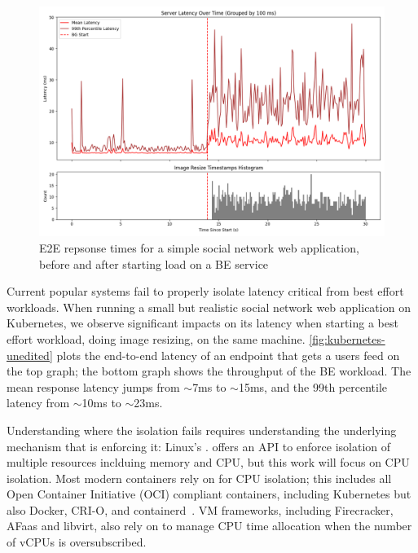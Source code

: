\begin{figure}[t]
    \centering
    \includegraphics[width=\columnwidth]{graphs/kubernetes-unedited.png}
    \caption{E2E repsonse times for a simple social network web application,
    before and after starting load on a BE
    service}\label{fig:kubernetes-unedited}
\end{figure}

Current popular systems fail to properly isolate latency critical from best
effort workloads. When running a small but realistic social network web
application on Kubernetes, we observe significant impacts on its latency when
starting a best effort workload, doing image resizing, on the same machine.
\autoref{fig:kubernetes-unedited} plots the end-to-end latency of an endpoint
that gets a users feed on the top graph; the bottom graph shows the throughput
of the BE workload. The mean response latency jumps from $\sim$7ms to
$\sim$15ms, and the 99th percentile latency from $\sim$10ms to $\sim$23ms. 

Understanding where the isolation fails requires understanding the underlying
mechanism that is enforcing it: Linux's \cgroups{}. \cgroups{} offers an API to
enforce isolation of multiple resources inclduing memory and CPU, but this work
will focus on CPU isolation. Most modern containers rely on \cgroups{} for CPU
isolation; this includes all Open Container Initiative (OCI) compliant
containers, including Kubernetes but also Docker, CRI-O, and
containerd~\cite{oci-cgroups,docker-docs-cgroups,container-isolation-article}.
VM frameworks, including Firecracker, AFaas and libvirt, also rely on \cgroups{}
to manage CPU time allocation when the number of vCPUs is
oversubscribed.~\cite{firecracker-cgroups,afaas,libvirt-cgroups}

